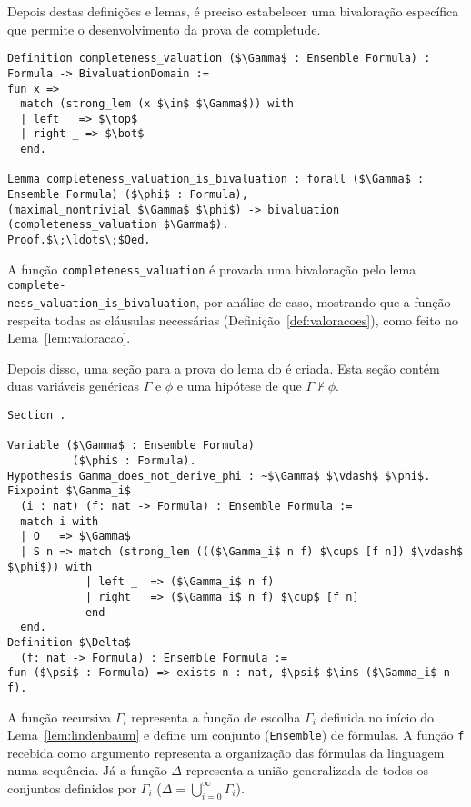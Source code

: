        Depois destas definições e lemas, é preciso estabelecer uma bivaloração específica que permite o desenvolvimento da prova de completude.
        
        \begin{lstlisting}[name=Completeness, frame=single, language=coq]
Definition completeness_valuation ($\Gamma$ : Ensemble Formula) : 
Formula -> BivaluationDomain :=
fun x =>
  match (strong_lem (x $\in$ $\Gamma$)) with
  | left _ => $\top$
  | right _ => $\bot$
  end.

Lemma completeness_valuation_is_bivaluation : forall ($\Gamma$ : Ensemble Formula) ($\phi$ : Formula),
(maximal_nontrivial $\Gamma$ $\phi$) -> bivaluation (completeness_valuation $\Gamma$).
Proof.$\;\ldots\;$Qed.
        \end{lstlisting}

        A função \texttt{completeness\_valuation} é provada uma bivaloração pelo lema \texttt{complete-\\ness\_valuation\_is\_bivaluation}, por análise de caso, mostrando que a função respeita todas as cláusulas necessárias (Definição~\ref{def:valoracoes}), como feito no Lema~\ref{lem:valoracao}.
    
        Depois disso, uma seção para a prova do lema do  é criada. Esta seção contém duas variáveis genéricas $\Gamma$ e $\phi$ e uma hipótese de que $\Gamma \nvdash \phi$.

        \begin{lstlisting}[name=Completeness, frame=single, language=coq]
Section .

Variable ($\Gamma$ : Ensemble Formula)
          ($\phi$ : Formula).
Hypothesis Gamma_does_not_derive_phi : ~$\Gamma$ $\vdash$ $\phi$.
Fixpoint $\Gamma_i$ 
  (i : nat) (f: nat -> Formula) : Ensemble Formula :=
  match i with
  | O   => $\Gamma$
  | S n => match (strong_lem ((($\Gamma_i$ n f) $\cup$ [f n]) $\vdash$ $\phi$)) with
            | left _  => ($\Gamma_i$ n f)
            | right _ => ($\Gamma_i$ n f) $\cup$ [f n]
            end
  end.
Definition $\Delta$
  (f: nat -> Formula) : Ensemble Formula :=
fun ($\psi$ : Formula) => exists n : nat, $\psi$ $\in$ ($\Gamma_i$ n f).

        \end{lstlisting}

        A função recursiva \texttt{$\Gamma_i$} representa a função de escolha $\Gamma_i$ definida no início do Lema~\ref{lem:lindenbaum} e define um conjunto (\texttt{Ensemble}) de fórmulas. A função \texttt{f} recebida como argumento representa a organização das fórmulas da linguagem numa sequência. Já a função \texttt{$\Delta$} representa a união generalizada de todos os conjuntos definidos por \texttt{$\Gamma_i$} ($\Delta = \bigcup_{i=0}^{\infty}\Gamma_i$). 

